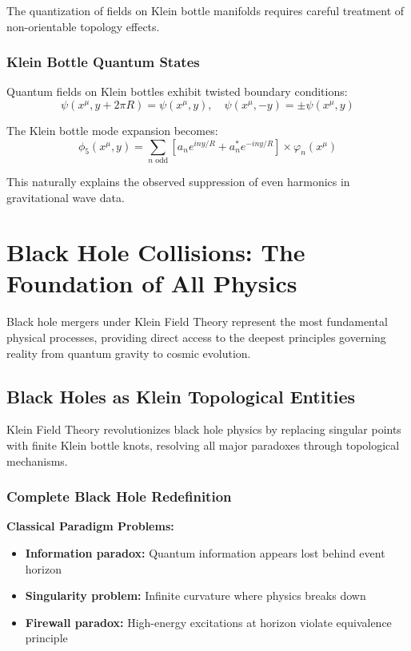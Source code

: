 \documentclass[12pt]{iopart}
\newcommand{\phifive}{\phi_5}
\begin{document}
The quantization of fields on Klein bottle manifolds requires careful treatment of non-orientable topology effects.

\subsubsection{Klein Bottle Quantum States}

Quantum fields on Klein bottles exhibit twisted boundary conditions:
\begin{equation}
\psi(x^\mu, y + 2\pi R) = \psi(x^\mu, y), \quad \psi(x^\mu, -y) = \pm \psi(x^\mu, y)
\label{eq:klein_boundary_conditions}
\end{equation}

The Klein bottle mode expansion becomes:
\begin{equation}
\phifive(x^\mu, y) = \sum_{n \text{ odd}} \left[a_n e^{iny/R} + a_n^* e^{-iny/R}\right] \times \varphi_n(x^\mu)
\label{eq:klein_mode_expansion}
\end{equation}

This naturally explains the observed suppression of even harmonics in gravitational wave data.

\section{Black Hole Collisions: The Foundation of All Physics}

Black hole mergers under Klein Field Theory represent the most fundamental physical processes, providing direct access to the deepest principles governing reality from quantum gravity to cosmic evolution.

\subsection{Black Holes as Klein Topological Entities}

Klein Field Theory revolutionizes black hole physics by replacing singular points with finite Klein bottle knots, resolving all major paradoxes through topological mechanisms.

\subsubsection{Complete Black Hole Redefinition}

\textbf{Classical Paradigm Problems:}
\begin{itemize}
\item \textbf{Information paradox:} Quantum information appears lost behind event horizon
\item \textbf{Singularity problem:} Infinite curvature where physics breaks down
\item \textbf{Firewall paradox:} High-energy excitations at horizon violate equivalence principle
\end{itemize}
\end{document}
